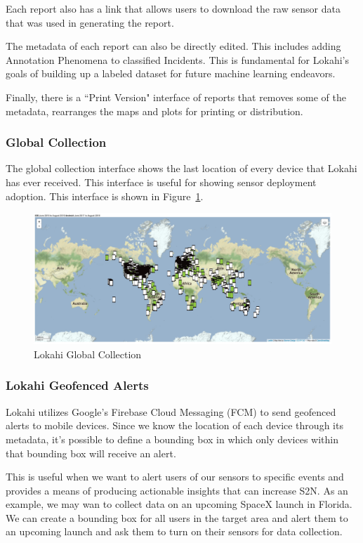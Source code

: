 Each report also has a link that allows users to download the raw sensor data that was used in generating the report.

The metadata of each report can also be directly edited. This includes adding Annotation Phenomena to classified Incidents. This is fundamental for Lokahi's goals of building up a labeled dataset for future machine learning endeavors.

Finally, there is a ``Print Version" interface of reports that removes some of the metadata, rearranges the maps and plots for printing or distribution.

\subsubsection{Global Collection}
The global collection interface shows the last location of every device that Lokahi has ever received. This interface is useful for showing sensor deployment adoption. This interface is shown in Figure~\ref{fig:lweb_global}.

\begin{figure}
	\centering
	\includegraphics[width=0.7\linewidth]{figures/lweb_global.jpg}
	\caption{Lokahi Global Collection}
	\label{fig:lweb_global}
\end{figure}

\subsubsection{Lokahi Geofenced Alerts}
Lokahi utilizes Google's Firebase Cloud Messaging (FCM) to send geofenced alerts to mobile devices. Since we know the location of each device through its metadata, it's possible to define a bounding box in which only devices within that bounding box will receive an alert.

This is useful when we want to alert users of our sensors to specific events and provides a means of producing actionable insights that can increase S2N. As an example, we may wan to collect data on an upcoming SpaceX launch in Florida. We can create a bounding box for all users in the target area and alert them to an upcoming launch and ask them to turn on their sensors for data collection.

